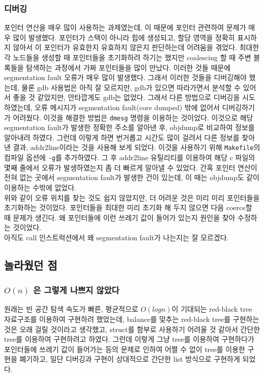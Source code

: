 \documentclass{report}
\begin{document}
\subsubsection{디버깅}
포인터 연산을 매우 많이 사용하는 과제였는데, 이 때문에 포인터 관련하여 문제가 매우 많이 발생했다. 포인터가 스택이 아니라 힙에 생성되고, 할당 영역을 정확히 표시하지 않아서 이 포인터가 유효한지 유효하지 않은지 판단하는데 어려움을 겪었다. 최대한 각 노드들을 생성할 때 포인터들을 초기화하려 하기는 했지만 coalescing 할 때 주변 블록들을 탐색하는 과정에서 가짜 포인터들을 많이 만났다. 이러한 것들 때문에 segmentation fault 오류가 매우 많이 발생했다. 그래서 이러한 것들을 디버깅해야 했는데, 물론 gdb 사용법은 아직 잘 모르지만, gdb가 있으면 따라가면서 분석할 수 있어서 좋을 것 같았지만, 안타깝게도 gdb는 없었다. 그래서 다른 방법으로 디버깅을 시도하였는데, 오류 메시지가 segmentation fault(core dumped) 밖에 없어서 디버깅하기가 어려웠다. 이것을 해결한 방법은 \lstinline{dmesg} 명령을 이용하는 것이었다. 이것으로 해당 segmentation fault가 발생한 정확한 주소를 알아낸 후, objdump로 비교하여 정보를 알아내려 하였다. 그런데 이렇게 하면 번거롭고 시간도 많이 걸려서 다른 정보를 찾아낸 결과, addr2line이라는 것을 사용해 보게 되었다. 이것을 사용하기 위해 \lstinline{Makefile}의 컴파일 옵션에 \lstinline{-g}를 추가하였다. 그 후 addr2line 유틸리티를 이용하여 해당 c 파일의 몇째 줄에서 오류가 발생하였는지 좀 더 빠르게 알아낼 수 있었다. 간혹 포인터 연산이 전혀 없는 곳에서 segmentation fault가 발생한 건이 있는데, 이 때는 objdump도 같이 이용하는 수밖에 없었다. \\ 
위와 같이 오류 위치를 찾는 것도 쉽지 않았지만, 더 어려운 것은 미리 미리 포인터들을 초기화하는 것이었다. 포인터들을 최대한 미리 초기화 해 두지 않으면 다음 coerce할 때 문제가 생긴다. 왜 포인터들에 이런 쓰레기 값이 들어가 있는지 원인을 찾아 수정하는 것이었다. \\ 
아직도 call 인스트럭션에서 왜 segmentation fault가 나는지는 잘 모르겠다.


\subsection{놀라웠던 점}
\subsubsection{$O(n)$ 은 그렇게 나쁘지 않았다}
원래는 빈 공간 탐색 속도가 빠른, 평균적으로 $O(log n)$이 기대되는 red-black tree 자료구조를 이용하여 구현하려 했었는데, balance를 맞추는 red-black tree를 구현하는 것은 오래 걸릴 것이라고 생각했고, struct를 함부로 사용하기 어려울 것 같아서 간단한 tree를 이용하여 구현하려고 하였다. 그런데 이렇게 그냥 tree를 이용하여 구현하다가 포인터들에 쓰레기 값이 들어가는 등의 문제로 인하여 어쩔 수 없이 tree를 이용한 구현을 폐기하고, 일단 디버깅과 구현이 상대적으로 간단한 list 방식으로 구현하게 되었다.
\end{document}
